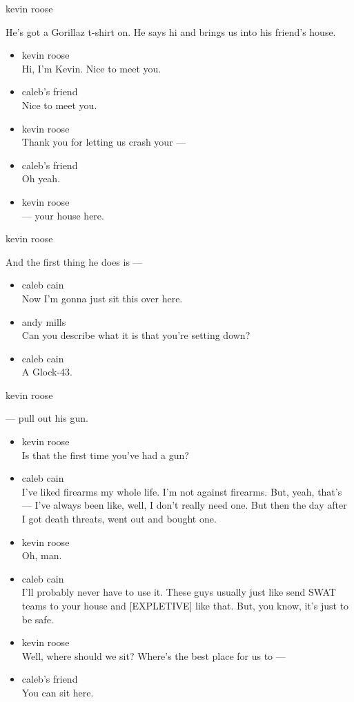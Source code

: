 kevin roose

He's got a Gorillaz t-shirt on. He says hi and brings us into his
friend's house.

\begin{itemize}
\item
  kevin roose\\
  Hi, I'm Kevin. Nice to meet you.
\item
  caleb's friend\\
  Nice to meet you.
\item
  kevin roose\\
  Thank you for letting us crash your ---
\item
  caleb's friend\\
  Oh yeah.
\item
  kevin roose\\
  --- your house here.
\end{itemize}

kevin roose

And the first thing he does is ---

\begin{itemize}
\item
  caleb cain\\
  Now I'm gonna just sit this over here.
\item
  andy mills\\
  Can you describe what it is that you're setting down?
\item
  caleb cain\\
  A Glock-43.
\end{itemize}

kevin roose

--- pull out his gun.

\begin{itemize}
\item
  kevin roose\\
  Is that the first time you've had a gun?
\item
  caleb cain\\
  I've liked firearms my whole life. I'm not against firearms. But,
  yeah, that's --- I've always been like, well, I don't really need one.
  But then the day after I got death threats, went out and bought one.
\item
  kevin roose\\
  Oh, man.
\item
  caleb cain\\
  I'll probably never have to use it. These guys usually just like send
  SWAT teams to your house and {[}EXPLETIVE{]} like that. But, you know,
  it's just to be safe.
\item
  kevin roose\\
  Well, where should we sit? Where's the best place for us to ---
\item
  caleb's friend\\
  You can sit here.
\end{itemize}

